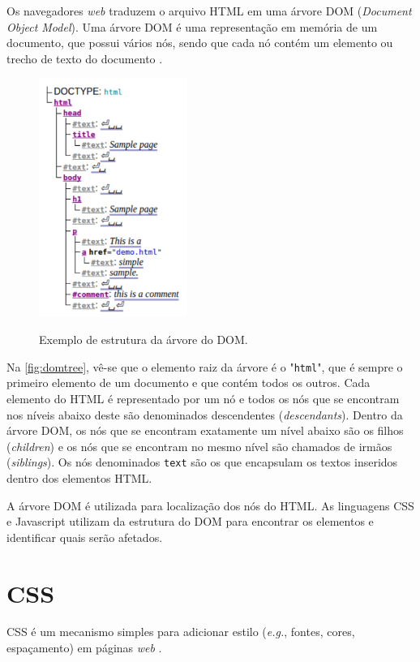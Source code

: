 Os navegadores \textit{web} traduzem o arquivo HTML em uma árvore DOM (\textit{Document Object Model}). Uma árvore DOM é uma representação em memória de um documento, que possui vários nós, sendo que cada nó contém um elemento ou trecho de texto do documento \cite{HTMLspec2014}.

\begin{figure}[!htb]
	\centering
	\caption{Exemplo de estrutura da árvore do DOM.}
	\includegraphics[width=0.43\textwidth]{./04-figuras/DOMsnippet}
	\label{fig:domtree}
\end{figure}

Na \autoref{fig:domtree}, vê-se que o elemento raiz da árvore é o "\texttt{html}", que é sempre o primeiro elemento de um documento e que contém todos os outros. Cada elemento do HTML é representado por um nó e todos os nós que se encontram nos níveis abaixo deste são denominados descendentes (\textit{descendants}). Dentro da árvore DOM, os nós que se encontram exatamente um nível abaixo são os filhos (\textit{children}) e os nós que se encontram no mesmo nível são chamados de irmãos (\textit{siblings}). Os nós denominados \texttt{text} são os que encapsulam os textos inseridos dentro dos elementos HTML.

A árvore DOM é utilizada para localização dos nós do HTML. As linguagens  CSS e Javascript utilizam da estrutura do DOM para encontrar os elementos e identificar quais serão afetados.

\section{CSS}
\label{sec:CSS}
CSS é um mecanismo simples para adicionar estilo (\textit{e.g.}, fontes, cores, espaçamento) em páginas \textit{web} \cite{W3Ccss2015}.

